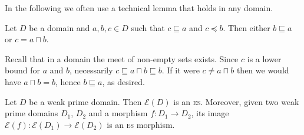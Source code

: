 \documentclass[conference]{IEEEtran}
\renewenvironment{proof}{\begin{IEEEproof}}{\end{IEEEproof}}
\newcommand{\esabbr}{\textsc{es}}
\newcommand{\zev}[0]{\ensuremath{\mathcal{E}}}
\newcommand{\ev}[1]{\ensuremath{\zev({#1})}}
\begin{document}
In the following we often use a technical lemma that holds in any domain.

\begin{lemma}
  \label{le:inf}
  Let $D$ be a domain and $a, b, c \in D$ such that
  $c \sqsubseteq a$ and $c \preceq b$. Then
  either $b \sqsubseteq a$ or $c = a \sqcap b$.
\end{lemma}


\begin{proof}
  Recall that in a domain the meet of non-empty  sets
  exists. Since $c$ is a lower bound for $a$ and $b$, necessarily
  $c \sqsubseteq a\sqcap b \sqsubseteq b$. If it were
  $c \neq a\sqcap b$ then we would have $a \sqcap b = b$, hence
  $b \sqsubseteq a$, as desired.
\end{proof}




\begin{lemma}
  \label{le:domain-to-es-wd}
  Let  $D$ be a weak prime domain. Then $\ev{D}$ is an {\esabbr}. Moreover, given two weak prime domains $D_1$, $D_2$ and a
  morphism $f : D_1 \to D_2$, its image
  $\ev{f} : \ev{D_1} \to \ev{D_2}$ is an {\esabbr} morphism.
\end{lemma}
\end{document}

